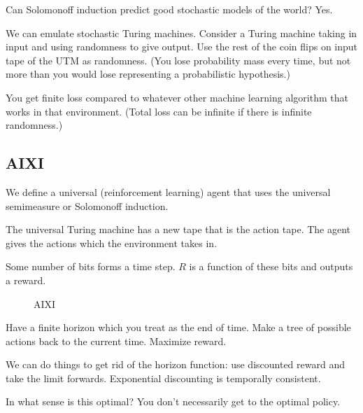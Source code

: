 \documentclass[11pt]{article}
\begin{document}
Can Solomonoff induction predict good stochastic models of the world? Yes.

We can emulate stochastic Turing machines. Consider a Turing machine taking in input and using randomness to give output. Use the rest of the coin flips on input tape of the UTM as randomness. (You lose probability mass every time, but not more than you would lose representing a probabilistic hypothesis.)


You get finite loss compared to whatever other machine learning algorithm that works in that environment. (Total loss can be infinite if there is infinite randomness.)

\subsection{AIXI}

We define a universal (reinforcement learning) agent that uses the universal semimeasure or Solomonoff induction.

The universal Turing machine has a new tape that is the action tape. The agent gives the actions which the environment takes in.

Some number of bits forms a time step. $R$ is a function of these bits and outputs a reward.

\begin{figure}
\caption{AIXI}
\end{figure}

Have a finite horizon which you treat as the end of time. Make a tree of possible actions %
back to the current time. Maximize reward.

We can do things to get rid of the horizon function: use discounted reward and take the limit forwards.
Exponential discounting is temporally consistent.

In what sense is this optimal?
You don't necessarily get to the optimal policy. 
\end{document}
